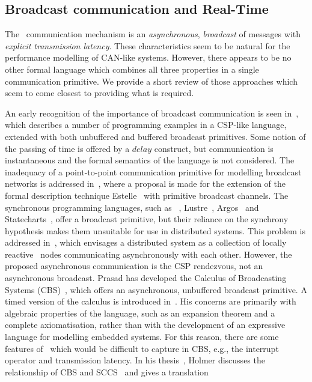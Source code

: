 \subsection{Broadcast communication and Real-Time}
The \bcandle\ communication mechanism is an \emph{asynchronous}, 
\emph{broadcast} of messages with \emph{explicit transmission latency}.
These characteristics seem to be natural for the performance modelling
of CAN-like systems. However, there appears to be no other formal
language which combines all three properties in a single communication
primitive. We provide a short review of those approaches which seem to
come closest to providing what is required.

An early recognition of the importance of broadcast communication is
seen in~\cite{geh:84}, which describes a number of programming
examples in a CSP-like language, extended with both unbuffered and
buffered broadcast primitives. Some notion of the passing of time is
offered by a $delay$ construct, but communication is instantaneous and
the formal semantics of the language is not considered. The inadequacy
of a point-to-point communication primitive for modelling broadcast
networks is addressed in~\cite{ca:91}, where a proposal is made for
the extension of the formal description technique
Estelle~\cite{iso:9074} with primitive broadcast channels. The
synchronous programming languages, such as \esterel~\cite{bg:92},
Lustre~\cite{hlr:92}, Argos~\cite{mar:92} and
Statecharts~\cite{har:87}, offer a broadcast primitive, but their
reliance on the synchrony hypothesis makes them unsuitable for use in
distributed systems. This problem is addressed in~\cite{brs:93},
which envisages a distributed system as a collection of locally
reactive \esterel\ nodes communicating asynchronously with each
other. However, the proposed asynchronous communication is the CSP
rendezvous, not an asynchronous broadcast.  Prasad has developed the
Calculus of Broadcasting Systems (CBS)~\cite{pra:95}, which offers an
asynchronous, unbuffered broadcast primitive. A timed version of the
calculus is introduced in~\cite{pra:96}. His concerns are primarily
with algebraic properties of the language, such as an expansion
theorem and a complete axiomatisation, rather than with the
development of an expressive language for modelling embedded systems.
For this reason, there are some features of \bcandle\ which would be
difficult to capture in CBS, e.g., the interrupt operator and
transmission latency. In his thesis~\cite{hol:94}, Holmer discusses
the relationship of CBS and SCCS~\cite{mil:89} and gives a translation
